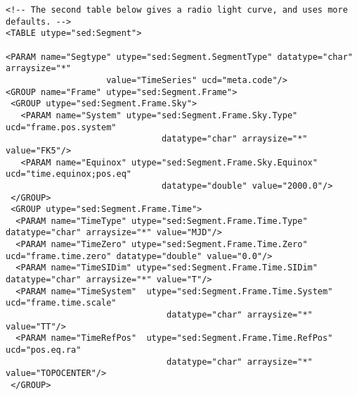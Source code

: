 \documentclass[11pt]{article}
\newenvironment{fmpage}
     {\begin{lrbox}{\fmbox}\begin{minipage}{6.5in}}
     {\end{minipage}\end{lrbox}\colorbox{iblue}{\fbox{\usebox{\fmbox}}}}
\begin{document}
{\begin{flushleft}
\begin{fmpage}
\begin{verbatim}
<!-- The second table below gives a radio light curve, and uses more defaults. -->
<TABLE utype="sed:Segment">   

<PARAM name="Segtype" utype="sed:Segment.SegmentType" datatype="char" arraysize="*" 
                    value="TimeSeries" ucd="meta.code"/>
<GROUP name="Frame" utype="sed:Segment.Frame">
 <GROUP utype="sed:Segment.Frame.Sky">
   <PARAM name="System" utype="sed:Segment.Frame.Sky.Type" ucd="frame.pos.system" 
                               datatype="char" arraysize="*" value="FK5"/>
   <PARAM name="Equinox" utype="sed:Segment.Frame.Sky.Equinox" ucd="time.equinox;pos.eq" 
                               datatype="double" value="2000.0"/>
 </GROUP>
 <GROUP utype="sed:Segment.Frame.Time">
  <PARAM name="TimeType" utype="sed:Segment.Frame.Time.Type" datatype="char" arraysize="*" value="MJD"/>
  <PARAM name="TimeZero" utype="sed:Segment.Frame.Time.Zero" ucd="frame.time.zero" datatype="double" value="0.0"/>
  <PARAM name="TimeSIDim" utype="sed:Segment.Frame.Time.SIDim" datatype="char" arraysize="*" value="T"/>
  <PARAM name="TimeSystem"  utype="sed:Segment.Frame.Time.System" ucd="frame.time.scale" 
                                datatype="char" arraysize="*" value="TT"/>
  <PARAM name="TimeRefPos"  utype="sed:Segment.Frame.Time.RefPos" ucd="pos.eq.ra" 
                                datatype="char" arraysize="*" value="TOPOCENTER"/>
 </GROUP>
\end{verbatim}
\end{fmpage}


\end{flushleft}}
\end{document}
